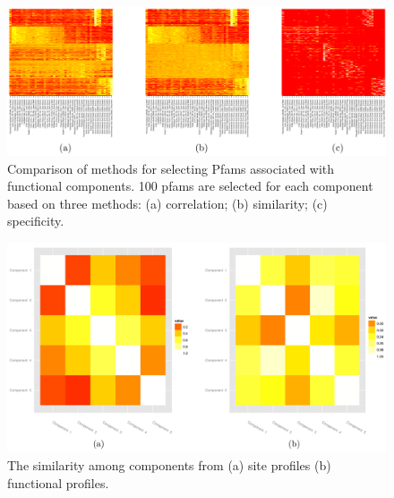

\begin{figure}[!ht]
\centering
 \includegraphics[width=\textwidth]{NMF/figures/figS4}
 \caption{Comparison of methods for selecting Pfams associated with functional components. 100 pfams are selected for each component based on three methods: (a) correlation; (b) similarity; (c) specificity.}
 \label{specComp}
\end{figure}

\begin{figure}[!ht]
\centering
 \includegraphics[width=\textwidth]{NMF/figures/figS5}
 \caption{The similarity among components from (a) site profiles (b) functional profiles.}
 \label{component_sim}
\end{figure}

